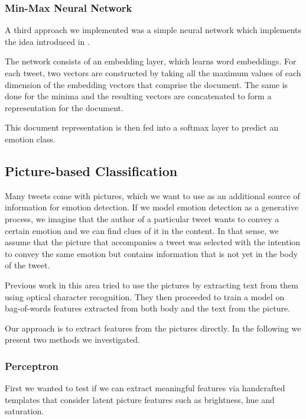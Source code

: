 \documentclass[11pt]{article}
\begin{document}
\subsubsection{Min-Max Neural Network}
\label{sssec:mmnn}

A third approach we implemented was a simple neural network which implements the
idea introduced in \cite{de2016representation}.

The network consists of an embedding layer, which learns word embeddings.
For each tweet, two vectors are constructed by taking all the maximum values
of each dimension of the embedding vectors that comprise the document.
The same is done for the minima and the resulting vectors are concatenated to
form a representation for the document.

This document representation is then fed into a softmax layer to predict an
emotion class.

\subsection{Picture-based Classification}

Many tweets come with pictures, which we want to use as an additional source of
information for emotion detection.
If we model emotion detection as a generative process, we imagine that the
author of a particular tweet wants to convey a certain emotion and we can find
clues of it in the content.
In that sense, we assume that the picture that accompanies a tweet was selected
with the intention to convey the same emotion but contains information that is
not yet in the body of the tweet.

Previous work in this area \cite{Klinger2017} tried to use the pictures by
extracting text from them using optical character recognition.
They then proceeded to train a model on bag-of-words features extracted from both
body and the text from the picture.

Our approach is to extract features from the pictures directly. In the following
we present two methods we investigated.

\subsubsection{Perceptron}

First we wanted to test if we can extract meaningful features via handcrafted
templates that consider latent picture features such as brightness, hue and
saturation.
\end{document}

